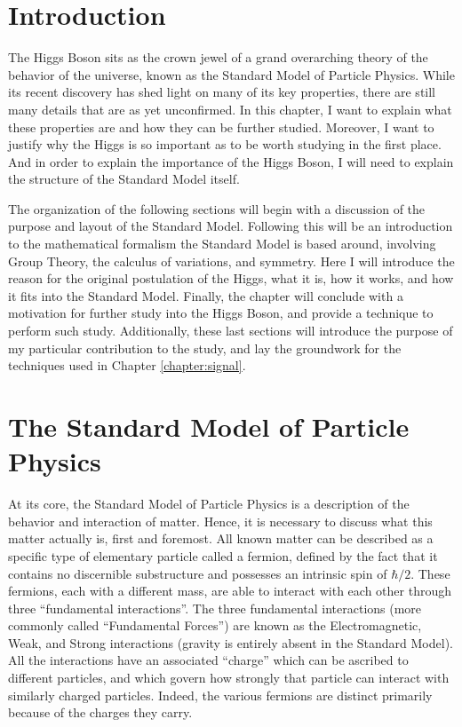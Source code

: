 \section{Introduction}

    The Higgs Boson sits as the crown jewel of a grand overarching theory of the behavior of the universe,
        known as the Standard Model of Particle Physics.
    While its recent discovery has shed light on many of its key properties,
        there are still many details that are as yet unconfirmed.
    In this chapter, I want to explain what these properties are and how they can be further studied.
    Moreover, I want to justify why the Higgs is so important as to be worth studying in the first place.
    And in order to explain the importance of the Higgs Boson,
        I will need to explain the structure of the Standard Model itself.

    The organization of the following sections will begin with a discussion of the purpose and layout of the Standard Model.
    Following this will be an introduction to the mathematical formalism the Standard Model is based around,
        involving Group Theory, the calculus of variations, and symmetry.
    Here I will introduce the reason for the original postulation of the Higgs, what it is, how it works, and how it fits into the Standard Model.
    Finally, the chapter will conclude with a motivation for further study into the Higgs Boson, and provide a technique to perform such study.
    Additionally, these last sections will introduce the purpose of my particular contribution to the study,
        and lay the groundwork for the techniques used in Chapter \ref{chapter:signal}.

\section{The Standard Model of Particle Physics}\label{sec:standard_model}
    
    At its core, the Standard Model of Particle Physics is a description of the behavior and interaction of matter.
    Hence, it is necessary to discuss what this matter actually is, first and foremost.
    All known matter can be described as a specific type of elementary particle called a fermion,
        defined by the fact that it contains no discernible substructure and possesses an intrinsic spin of $\hbar/2$.
    These fermions, each with a different mass, are able to interact with each other through three ``fundamental interactions''.
    The three fundamental interactions (more commonly called ``Fundamental Forces'') are known as
        the Electromagnetic, Weak, and Strong interactions (gravity is entirely absent in the Standard Model).
    All the interactions have an associated ``charge'' which can be ascribed to different particles,
        and which govern how strongly that particle can interact with similarly charged particles.
    Indeed, the various fermions are distinct primarily because of the charges they carry.

